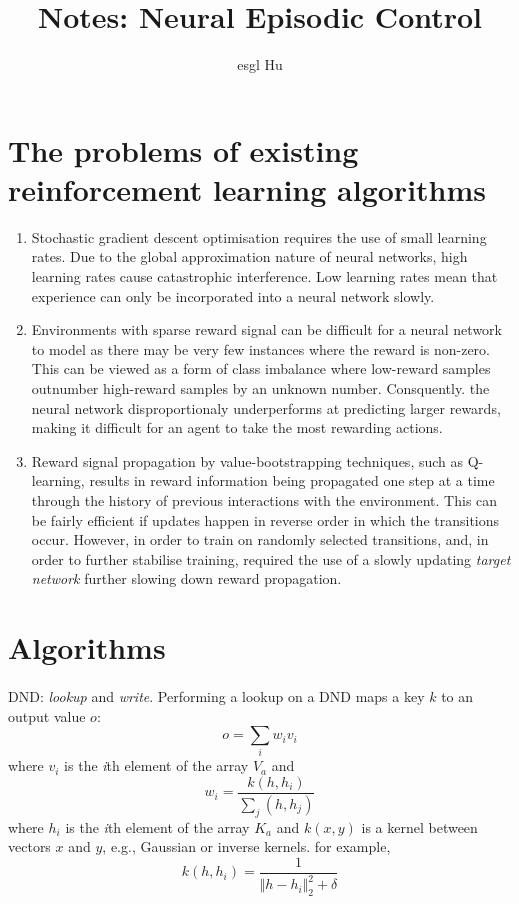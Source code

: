 \documentclass[12pt,a4paper]{article}
\begin{document}
\title{Notes: Neural Episodic Control}
\author{esgl Hu}
\maketitle
\section{The problems of existing reinforcement learning algorithms} \cite{Pritzel2017Neural}
\begin{enumerate}
			\item Stochastic gradient descent optimisation requires the use of small learning rates. Due to the global approximation nature of neural networks, high learning rates cause catastrophic interference. Low learning rates mean that experience can only be incorporated into a neural network slowly.
			\item Environments with sparse reward signal can be difficult for a neural network to model as there may be very few instances where the reward is non-zero. This can be viewed as a form of class imbalance where low-reward samples outnumber high-reward samples by an unknown number. Consquently. the neural network disproportionaly underperforms at predicting larger rewards, making it difficult for an agent to take the most rewarding actions.
			\item Reward signal propagation by value-bootstrapping techniques, such as Q-learning, results in reward information being propagated one step at a time through the history of previous interactions with the environment. This can be fairly efficient if updates happen in reverse order in which the transitions occur. However, in order to train on randomly selected transitions, and, in order to further stabilise training, required the use of a slowly updating \textit{target network} further slowing down reward propagation.
\end{enumerate}

\section{Algorithms}
\paragraph{} DND: \textit{lookup} and \textit{write}. Performing a lookup on a DND maps a key $k$ to an output value $o$:
\begin{equation}\label{equation_1}
o = \sum_{i}w_{i}v_{i}
\end{equation}
where $v_{i}$ is the \textit{i}th element of the array $V_{a}$ and 
\begin{equation} \label{equation_2}
w_{i} = \frac{k(h, h_{i})}{\sum_{j}(h, h_{j})}
\end{equation}
where $h_{i}$ is the \textit{i}th element of the array $K_{a}$ and $k(x, y)$ is a kernel between vectors $x$ and $y$, e.g., Gaussian or inverse kernels. for example, 
\begin{equation}
k(h, h_{i}) = \frac{1}{{\Vert h - h_{i} \Vert}_{2}^{2} + \delta}
\end{equation}
\end{document}
